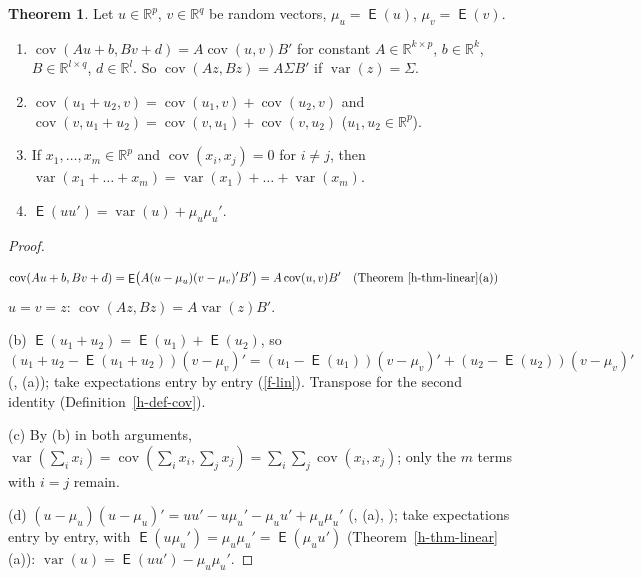 \documentclass[12pt]{article}
\newcommand{\R}{\mathbb R}
\DeclareMathOperator\expc{\mathsf{E}}
\DeclareMathOperator\var{var}
\DeclareMathOperator\cov{cov}
\theoremstyle{definition}
\newtheorem{theorem}{Theorem}
\newcommand{\boardtop}{\vspace*{-\abovedisplayskip}}
\begin{document}
\begin{theorem}\label{h-thm-cov}
Let \(u\in\R^p\), \(v\in\R^q\) be random vectors, \(\mu_u=\expc(u)\), \(\mu_v=\expc(v)\).
\begin{enumerate}
\item \(\cov(Au+b,Bv+d)=A\cov(u,v)B'\) for constant \(A\in\R^{k\times p}\), \(b\in\R^k\),
\(B\in\R^{l\times q}\), \(d\in\R^l\). So \(\cov(Az,Bz)=A\Sigma B'\) if \(\var(z)=\Sigma\).
\item \(\cov(u_1+u_2,v)=\cov(u_1,v)+\cov(u_2,v)\) and
\(\cov(v,u_1+u_2)=\cov(v,u_1)+\cov(v,u_2)\) (\(u_1,u_2\in\R^p\)).
\item If \(x_1,\dots,x_m\in\R^p\) and \(\cov(x_i,x_j)=0\) for \(i\ne j\), then
\(\var(x_1+\dots+x_m)=\var(x_1)+\dots+\var(x_m)\).
\item \(\expc(uu')=\var(u)+\mu_u\mu_u'\).
\end{enumerate}
\end{theorem}
\begin{proof}
\begin{board}[(a) By Theorem~\ref{h-thm-linear}(b): \(Au+b-\expc(Au+b)=A(u-\mu_u)\), \(Bv+d-\expc(Bv+d)=B(v-\mu_v)\);
transposes (\lec{1}, \lit{Theorem~8}):]
\boardtop
\begin{align*}
\cov(Au+b,Bv+d)&=\expc\bigl(A(u-\mu_u)(v-\mu_v)'B'\bigr)=A\cov(u,v)B'
&&\text{(Theorem~\ref{h-thm-linear}(a))}
\end{align*}
\(u=v=z\): \(\cov(Az,Bz)=A\var(z)B'\).
\end{board}
(b) \(\expc(u_1+u_2)=\expc(u_1)+\expc(u_2)\), so
\((u_1+u_2-\expc(u_1+u_2))(v-\mu_v)'=(u_1-\expc(u_1))(v-\mu_v)'+(u_2-\expc(u_2))(v-\mu_v)'\)
(, (a)); take expectations entry by entry (\ref{f-lin}). Transpose for the second identity
(Definition~\ref{h-def-cov}).

(c) By (b) in both arguments,
\(\var(\sum_ix_i)=\cov(\sum_ix_i,\sum_jx_j)=\sum_i\sum_j\cov(x_i,x_j)\); only the
\(m\) terms with \(i=j\) remain.

(d) \((u-\mu_u)(u-\mu_u)'=uu'-u\mu_u'-\mu_uu'+\mu_u\mu_u'\) (, (a), ); take expectations entry by entry, with
\(\expc(u\mu_u')=\mu_u\mu_u'=\expc(\mu_uu')\) (Theorem~\ref{h-thm-linear}(a)):
\(\var(u)=\expc(uu')-\mu_u\mu_u'\).
\end{proof}
\end{document}
